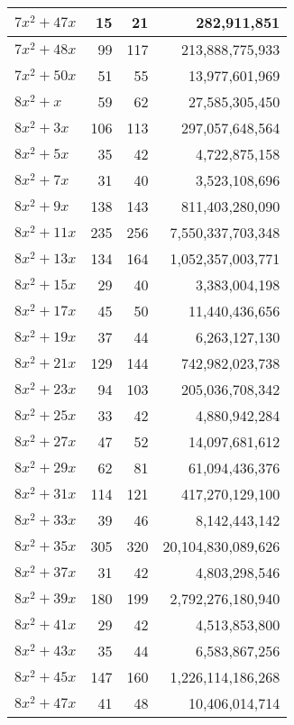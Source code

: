 \documentclass[a4paper]{amsproc}
\theoremstyle{plain}
\theoremstyle{named}
\begin{document}
\begin{longtable}{ | l | r | r | r | }
$7x^2 + 47x$ & 15 & 21 & 282{,}911{,}851 \\ \hline
$7x^2 + 48x$ & 99 & 117 & 213{,}888{,}775{,}933 \\ \hline
$7x^2 + 50x$ & 51 & 55 & 13{,}977{,}601{,}969 \\ \hline
$8x^2 + x$ & 59 & 62 & 27{,}585{,}305{,}450 \\ \hline
$8x^2 + 3x$ & 106 & 113 & 297{,}057{,}648{,}564 \\ \hline
$8x^2 + 5x$ & 35 & 42 & 4{,}722{,}875{,}158 \\ \hline
$8x^2 + 7x$ & 31 & 40 & 3{,}523{,}108{,}696 \\ \hline
$8x^2 + 9x$ & 138 & 143 & 811{,}403{,}280{,}090 \\ \hline
$8x^2 + 11x$ & 235 & 256 & 7{,}550{,}337{,}703{,}348 \\ \hline
$8x^2 + 13x$ & 134 & 164 & 1{,}052{,}357{,}003{,}771 \\ \hline
$8x^2 + 15x$ & 29 & 40 & 3{,}383{,}004{,}198 \\ \hline
$8x^2 + 17x$ & 45 & 50 & 11{,}440{,}436{,}656 \\ \hline
$8x^2 + 19x$ & 37 & 44 & 6{,}263{,}127{,}130 \\ \hline
$8x^2 + 21x$ & 129 & 144 & 742{,}982{,}023{,}738 \\ \hline
$8x^2 + 23x$ & 94 & 103 & 205{,}036{,}708{,}342 \\ \hline
$8x^2 + 25x$ & 33 & 42 & 4{,}880{,}942{,}284 \\ \hline
$8x^2 + 27x$ & 47 & 52 & 14{,}097{,}681{,}612 \\ \hline
$8x^2 + 29x$ & 62 & 81 & 61{,}094{,}436{,}376 \\ \hline
$8x^2 + 31x$ & 114 & 121 & 417{,}270{,}129{,}100 \\ \hline
$8x^2 + 33x$ & 39 & 46 & 8{,}142{,}443{,}142 \\ \hline
$8x^2 + 35x$ & 305 & 320 & 20{,}104{,}830{,}089{,}626 \\ \hline
$8x^2 + 37x$ & 31 & 42 & 4{,}803{,}298{,}546 \\ \hline
$8x^2 + 39x$ & 180 & 199 & 2{,}792{,}276{,}180{,}940 \\ \hline
$8x^2 + 41x$ & 29 & 42 & 4{,}513{,}853{,}800 \\ \hline
$8x^2 + 43x$ & 35 & 44 & 6{,}583{,}867{,}256 \\ \hline
$8x^2 + 45x$ & 147 & 160 & 1{,}226{,}114{,}186{,}268 \\ \hline
$8x^2 + 47x$ & 41 & 48 & 10{,}406{,}014{,}714 \\ \hline

\end{longtable}
\end{document}
